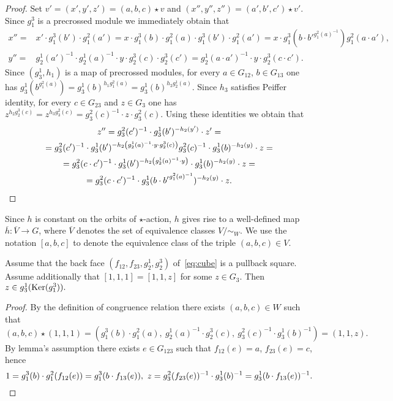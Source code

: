 \begin{proof}
    Set $v'=(x', y', z') = (a, b, c) \star v$ and $(x'', y'', z'') = (a', b', c') \star v'$.
    Since $g_1^3$ is a precrossed module we immediately obtain that
    \begin{align*}
        x'' =& x' \cdot g_1^3(b') \cdot g_1^2(a') = x \cdot g_1^3(b) \cdot g_1^2(a) \cdot g_1^3(b') \cdot g_1^2(a') = x \cdot g_1^3(b \cdot b'^{g_1^2(a)^{-1}}) g_1^2(a \cdot a'),\\
        y'' =& g_2^1(a')^{-1} \cdot g_2^1(a)^{-1} \cdot y \cdot g_2^3(c) \cdot g_2^3(c') = g_2^1(a\cdot a')^{-1} \cdot y \cdot g_2^{3}(c\cdot c'). \end{align*}
    Since $(g_3^1, h_1)$ is a map of precrossed modules, for every $a \in G_{12}$, $b \in G_{13}$ one has $g_3^1(b^{g_1^2(a)}) = g_3^1(b)^{h_1 g_1^2(a)} = g_3^1(b)^{h_2g_2^1(a)}$.
    Since $h_3$ satisfies Peiffer identity, for every $c \in G_{23}$ and $z \in G_3$ one has $z ^{h_2 g_2^3(c)} = z^{ h_3 g_3^2(c)} = g_3^2(c)^{-1} \cdot z \cdot g_3^2(c)$.
    Using these identities we obtain that
    \begin{multline*}
        z'' = g_3^2(c')^{-1} \cdot g_3^1(b')^{-h_2(y')} \cdot z' = \\
        = g_3^2(c')^{-1} \cdot g_3^1(b')^{- h_2 \left( g_2^1(a)^{-1} \cdot y \cdot g_2^3(c) \right)} g_3^2(c)^{-1} \cdot g_3^1(b)^{-h_2(y)} \cdot z = \\
        = g_3^2(c \cdot c')^{-1} \cdot g_3^1(b')^{- h_2 \left( g_2^1(a)^{-1} \cdot y \right)} \cdot g_3^1(b)^{-h_2(y)} \cdot z = \\
        = g_3^2(c \cdot c')^{-1} \cdot g_3^1(b \cdot {b'} ^ {g_1^2(a)^{-1}})^{- h_2 \left( y \right)} \cdot z. \qedhere
    \end{multline*}
\end{proof}
Since $h$ is constant on the orbits of $\star$-action, $h$ gives rise to a well-defined map $\overline{h} \colon \overline{V} \to G$,
 where $\overline{V}$ denotes the set of equivalence classes $V/\sim_W.$
We use the notation $[a, b, c]$ to denote the equivalence class of the triple $(a, b, c) \in V$.

\begin{lemma}\label{lem:one-one-z} Assume that the back face $(f_{12}, f_{23}, g_2^1, g_2^3)$ of~\eqref{eq:cube} is a pullback square.
Assume additionally that $[1, 1, 1] = [1, 1, z]$ for some $z\in G_3$.
Then $z \in g_3^1(\operatorname{Ker}(g_1^3)).$ \end{lemma}
\begin{proof} By the definition of congruence relation there exists $(a, b, c)\in W$ such that
\[ (a, b, c) \star (1, 1, 1) = ( g_1^3(b) \cdot g_1^2(a),\ g_2^1(a)^{-1} \cdot g_2^3(c),\ g_3^2(c)^{-1} \cdot g_3^1(b)^{-1}) = (1,1,z). \]
By lemma's assumption there exists $e \in G_{123}$ such that $f_{12}(e) = a$, $f_{23}(e) = c$, hence
\[ 1 = g_1^3(b) \cdot g_1^2(f_{12}(e)) = g_1^3(b \cdot f_{13}(e)),\ z = g_3^2(f_{23}(e))^{-1} \cdot g_3^1(b)^{-1} = g_3^1(b \cdot f_{13}(e))^{-1}. \qedhere\] \end{proof}


